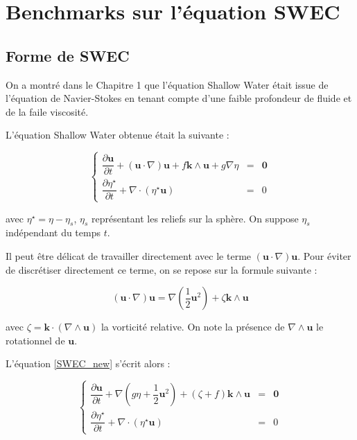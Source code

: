 \chapter{Benchmarks sur l'équation SWEC}

\section{Forme de SWEC}

On a montré dans le Chapitre 1 que l'équation Shallow Water était issue de l'équation de Navier-Stokes en tenant compte d'une faible profondeur de fluide et de la faile viscosité.

L'équation Shallow Water obtenue était la suivante :

\begin{equation}
\label{SWEC_new}
\left\lbrace
\begin{array}{rcl}
\dfrac{\partial \mathbf{u}}{\partial t} + \left( \mathbf{u} \cdot \nabla \right) \mathbf{u} + f \mathbf{k} \wedge \mathbf{u} + g \nabla \eta & = & \mathbf{0} \\
\dfrac{\partial \eta^{\star}}{\partial t} + \nabla \cdot \left( \eta^{\star} \mathbf{u} \right) & = & 0
\end{array}
\right.
\end{equation}

avec $\eta^{\star} = \eta - \eta_s$, $\eta_s$ représentant les reliefs sur la sphère. On suppose $\eta_s$ indépendant du temps $t$.

Il peut être délicat de travailler directement avec le terme $\left( \mathbf{u} \cdot \nabla \right) \mathbf{u}$. Pour éviter de discrétiser directement ce terme, on se repose sur la formule suivante :

\begin{equation}
\left( \mathbf{u} \cdot \nabla \right) \mathbf{u} = \nabla \left( \dfrac{1}{2} \mathbf{u}^2 \right) + \zeta \mathbf{k} \wedge \mathbf{u}
\end{equation}

avec $\zeta = \mathbf{k} \cdot \left( \nabla \wedge \mathbf{u} \right)$ la vorticité relative. On note la présence de $\nabla \wedge \mathbf{u}$ le rotationnel de $\mathbf{u}$.

L'équation \eqref{SWEC_new} s'écrit alors :

\begin{equation}
\label{SWEC_vectform}
\left\lbrace
\begin{array}{rcl}
\dfrac{\partial \mathbf{u}}{\partial t} + \nabla \left( g \eta + \dfrac{1}{2} \mathbf{u}^2  \right) + \left( \zeta + f \right) \mathbf{k} \wedge \mathbf{u} & = & \mathbf{0} \\
\dfrac{\partial \eta^{\star}}{\partial t} + \nabla \cdot \left( \eta^{\star} \mathbf{u} \right) & = & 0
\end{array}
\right.
\end{equation}


